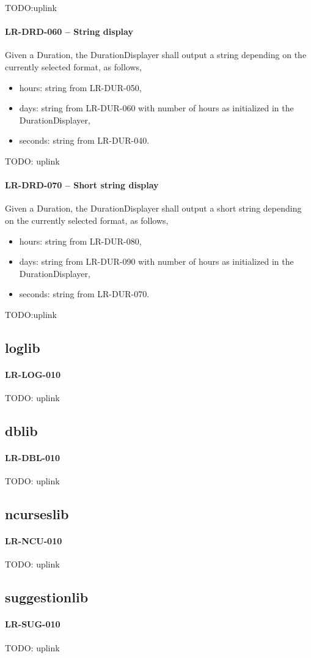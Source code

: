 TODO:uplink
\paragraph{LR-DRD-060 -- String display}
Given a Duration, the DurationDisplayer shall output a string depending
on the currently selected format, as follows,
\begin{itemize}
\item hours: string from LR-DUR-050,
\item days: string from LR-DUR-060 with number of hours as initialized in the
            DurationDisplayer,
\item seconds: string from LR-DUR-040.
\end{itemize}

TODO: uplink
\paragraph{LR-DRD-070 -- Short string display}
Given a Duration, the DurationDisplayer shall output a short string depending
on the currently selected format, as follows,
\begin{itemize}
\item hours: string from LR-DUR-080,
\item days: string from LR-DUR-090 with number of hours as initialized in the
            DurationDisplayer,
\item seconds: string from LR-DUR-070.
\end{itemize}

TODO:uplink
\subsection{log\textunderscore lib}
\paragraph{LR-LOG-010}
TODO: uplink

\subsection{db\textunderscore lib}
\paragraph{LR-DBL-010}
TODO: uplink

\subsection{ncurses\textunderscore lib}
\paragraph{LR-NCU-010}
TODO: uplink

\subsection{suggestion\textunderscore lib}
\paragraph{LR-SUG-010}
TODO: uplink
